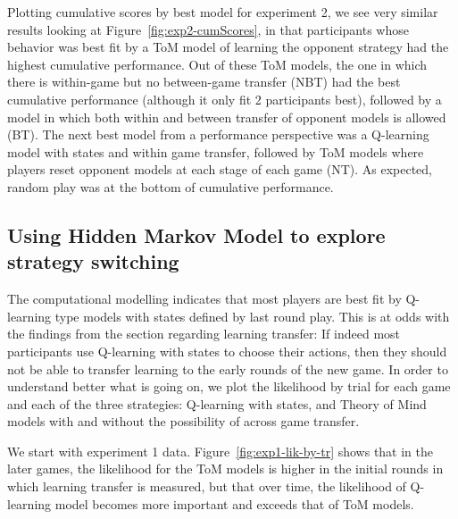 \documentclass[man,floatsintext]{apa6}
\begin{document}
Plotting cumulative scores by best model for experiment 2, we see very similar results looking at Figure~\ref{fig:exp2-cumScores}, in that participants whose behavior was best fit by a ToM model of learning the opponent strategy had the highest cumulative performance. Out of these ToM models, the one in which there is within-game but no between-game transfer (NBT) had the best cumulative performance (although it only fit 2 participants best), followed by a model in which both within and between transfer of opponent models is allowed (BT). The next best model from a performance perspective was a Q-learning model with states and within game transfer, followed by ToM models where players reset opponent models at each stage of each game (NT). As expected, random play was at the bottom of cumulative performance.

\hypertarget{using-hidden-markov-model-to-explore-strategy-switching}{%
\subsection{Using Hidden Markov Model to explore strategy switching}\label{using-hidden-markov-model-to-explore-strategy-switching}}

The computational modelling indicates that most players are best fit by Q-learning type models with states defined by last round play. This is at odds with the findings from the section regarding learning transfer: If indeed most participants use Q-learning with states to choose their actions, then they should not be able to transfer learning to the early rounds of the new game. In order to understand better what is going on, we plot the likelihood by trial for each game and each of the three strategies: Q-learning with states, and Theory of Mind models with and without the possibility of across game transfer.

We start with experiment 1 data. Figure~\ref{fig:exp1-lik-by-tr} shows that in the later games, the likelihood for the ToM models is higher in the initial rounds in which learning transfer is measured, but that over time, the likelihood of Q-learning model becomes more important and exceeds that of ToM models.
\end{document}
